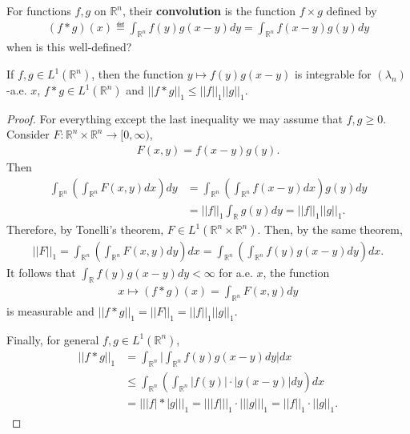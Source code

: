 For functions \(f,g\) on \(\mathbb{R}^n\), their \textbf{convolution} is the function \(f\times g\) defined by
\begin{align*}
    (f\ast g)(x) \eqdef \int_{\mathbb{R}^n} f(y) g(x-y) dy = \int_{\mathbb{R}^n} f(x-y)g(y) dy
\end{align*}
when is this well-defined?
\begin{lemma}
    If \(f,g\in L^1(\mathbb{R}^n)\), then the function \(y\mapsto f(y)g(x-y)\) is integrable for \((\lambda_n)\)-a.e. \(x\), \(f\ast g\in L^1(\mathbb{R}^n)\) and \(||f\ast g||_1\leq||f||_1 ||g||_1\).
\end{lemma}
\ifdetailed 
\begin{proof}
    For everything except the last inequality we may assume that \(f,g\geq 0\). Consider \(F:\mathbb{R}^n\times\mathbb{R}^n\rightarrow [0,\infty)\),
    \begin{align*}
        F(x,y) = f(x-y)g(y).
    \end{align*}
    Then 
    \begin{align*}
        \int_{\mathbb{R}^n}\left(\int_{\mathbb{R}^n}F(x,y)dx\right)dy &= \int_{\mathbb{R}^n}\left(\int_{\mathbb{R}^n}f(x-y)dx\right)g(y)dy \\
        &=||f||_1\int_{\mathbb{R}}g(y)dy = ||f||_1 ||g||_1. 
    \end{align*}
    Therefore, by Tonelli's theorem, \(F\in L^1(\mathbb{R}^n\times\mathbb{R}^n)\). Then, by the same theorem, 
    \begin{align*}
        ||F||_1 = \int_{\mathbb{R}^n}\left(\int_{\mathbb{R}^n}F(x,y)dy\right)dx = \int_{\mathbb{R}^n}\left(\int_{\mathbb{R}^n}f(y)g(x-y)dy\right)dx.
    \end{align*}
    It follows that \(\int_{\mathbb{R}}f(y)g(x-y)dy<\infty\) for a.e. \(x\), the function 
    \begin{align*}
        x\mapsto (f\ast g)(x) = \int_{\mathbb{R}^n}F(x,y) dy
    \end{align*}
    is measurable and \(||f\ast g||_1 = ||F||_1 = ||f||_1 ||g||_1\). 

    Finally, for general \(f,g\in L^1(\mathbb{R}^n)\), 
    \begin{align*}
        ||f\ast g||_1 &= \int_{\mathbb{R}^n}\Big\vert \int_{\mathbb{R}^n}f(y)g(x-y)dy\Big\vert dx \\
        &\leq \int_{\mathbb{R}^n}\left(\int_{\mathbb{R}^n} |f(y)|\cdot |g(x-y)|dy\right)dx \\ 
        &= || |f|\ast |g|||_1 = |||f|||_1 \cdot || |g| ||_1 = ||f||_1\cdot ||g||_1.
    \end{align*}
\end{proof}
\fi 


